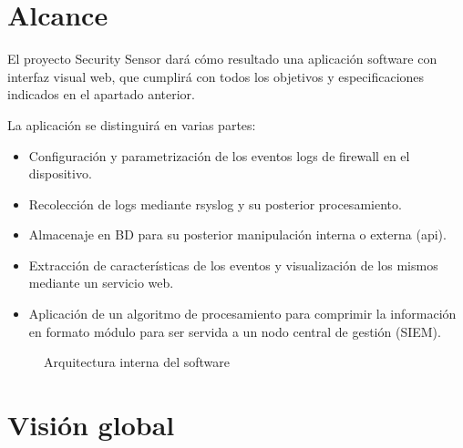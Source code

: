\section{Alcance}

El proyecto Security Sensor dará cómo resultado una aplicación software con interfaz visual web, que cumplirá con todos los objetivos y especificaciones indicados en el apartado anterior.

La aplicación se distinguirá en varias partes:
\begin{itemize}
\item Configuración y parametrización de los eventos logs de firewall en el dispositivo.
\item Recolección de logs mediante rsyslog y su posterior procesamiento.
\item Almacenaje en BD para su posterior manipulación interna o externa (api).
\item Extracción de características de los eventos y visualización de los mismos mediante un servicio web.
\item Aplicación de un algoritmo de procesamiento para comprimir la información en formato módulo para ser servida a un nodo central de gestión (SIEM).
\end{itemize}

\begin{figure}[H]
  \caption{Arquitectura interna del software}
\end{figure}

\section{Visión global}

